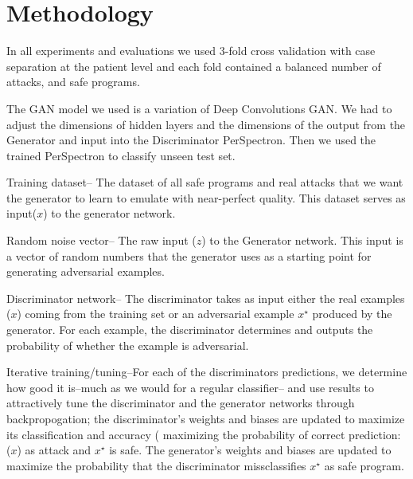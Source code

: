 \section{Methodology}\label{method}
In all experiments and evaluations we used 3-fold cross validation with case separation at
the patient level and each fold contained a balanced number
of attacks, and safe programs.


The GAN model we used is a variation of Deep Convolutions GAN. We had to adjust the dimensions of hidden layers and the dimensions of the output from the Generator and input into the Discriminator PerSpectron. Then we used the trained PerSpectron to classify unseen test set.  

Training dataset-- The dataset of all safe programs and real attacks that we want the generator to learn to emulate with near-perfect quality. This dataset serves as input($x$) to the generator network. 

Random noise vector-- The raw input ($z$) to the Generator network. This input is a vector of random numbers that the generator uses as a starting point for generating adversarial examples. 

Discriminator network-- The discriminator takes as input either the real examples ($x$) coming from the training set or an adversarial example $x^{\star}$ produced by the generator. For each example, the discriminator determines and outputs the probability of whether the example is adversarial.

Iterative training/tuning--For each of the discriminators predictions, we determine how good it is--much as we would for a regular classifier-- and use results to attractively tune the discriminator and the generator networks through backpropogation; the discriminator's weights and biases are updated to maximize its classification and accuracy ( maximizing the probability of correct prediction: ($x$) as attack and $x^{\star}$ is safe. 
The generator's weights and biases are updated to maximize the probability that the discriminator missclassifies $x^{\star}$ as safe program. 



